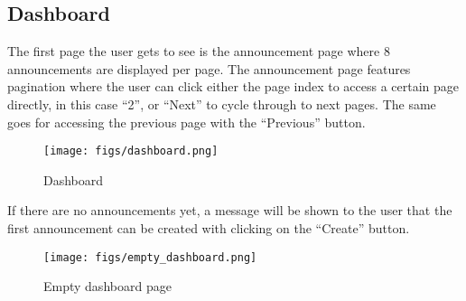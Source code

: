 \documentclass[conference]{IEEEtran}
\begin{document}
\subsection{Dashboard}
The first page the user gets to see is the announcement page where 8 announcements are displayed per page. The announcement page features pagination where the user can click either the page index to access a certain page directly, in this case “2”, or “Next” to cycle through to next pages. The same goes for accessing the previous page with the “Previous” button.
\begin{figure}[H]
\centering
\texttt{[image: figs/dashboard.png]}
\caption{Dashboard}
\label{fig:Dashboard}
\end{figure}
If there are no announcements yet, a message will be shown to the user that the first announcement can be created with clicking on the “Create” button.
\begin{figure}[H]
\centering
\texttt{[image: figs/empty\_dashboard.png]}
\caption{Empty dashboard page}
\label{fig:Empty dashboard page}
\end{figure}
\end{document}
